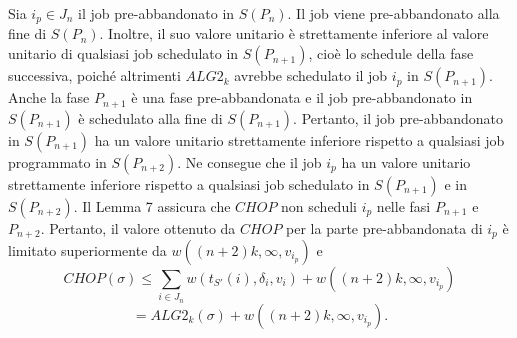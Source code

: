 \documentclass[12pt]{article}
\begin{document}
Sia $i_{p} \in J_{n}$ il job pre-abbandonato in $S(P_{n})$. Il job viene pre-abbandonato alla fine di $S(P_{n})$. Inoltre, il suo valore unitario è strettamente inferiore al valore unitario di qualsiasi job schedulato in $S(P_{n+1})$, cioè lo schedule della fase successiva, poiché altrimenti $ALG2_{k}$ avrebbe schedulato il job $i_{p}$ in $S(P_{n+1})$. Anche la fase $P_{n+1}$ è una fase pre-abbandonata e il job pre-abbandonato in $S (P_{n+1})$ è schedulato alla fine di $S(P_{n+1})$. Pertanto, il job pre-abbandonato in $S(P_{n+1})$ ha un valore unitario strettamente inferiore rispetto a qualsiasi job programmato in $S(P_{n + 2})$. Ne consegue che il job $i_{p}$ ha un valore unitario strettamente inferiore rispetto a qualsiasi job schedulato in $S (P_{n+1})$ e in $S (P_{n+2})$. Il Lemma 7 assicura che $CHOP$ non scheduli $i_{p}$ nelle fasi $P_{n+1}$ e $P_{n+2}$. Pertanto, il valore ottenuto da $CHOP$ per la parte pre-abbandonata di $i_{p}$  è limitato superiormente da $w((n + 2) k, \infty, v_{i_{p}})$ e
$$CHOP(\sigma) \leq \sum_{i \in J_{n}} w(t_{S'}(i), \delta_{i}, v_{i}) + w((n + 2)k, \infty, v_{i_{p}})$$ 
$$ = ALG2_{k}(\sigma) + w((n + 2)k, \infty , v_{i_{p}}).$$
\end{document}
